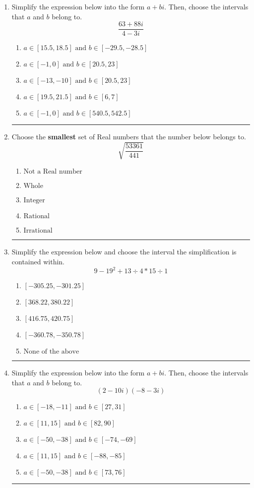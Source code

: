 \documentclass[14pt]{extbook}
\newcommand{\litem}[1]{\item#1\hspace*{-1cm}\rule{\textwidth}{0.4pt}}
\begin{document}
\begin{enumerate}
{\begin{enumerate}[label=\Alph*.]
\end{enumerate} }
\litem{
Simplify the expression below into the form $a+bi$. Then, choose the intervals that $a$ and $b$ belong to.\[ \frac{63 + 88 i}{4 - 3 i} \]\begin{enumerate}[label=\Alph*.]
\item \( a \in [15.5, 18.5] \text{ and } b \in [-29.5, -28.5] \)
\item \( a \in [-1, 0] \text{ and } b \in [20.5, 23] \)
\item \( a \in [-13, -10] \text{ and } b \in [20.5, 23] \)
\item \( a \in [19.5, 21.5] \text{ and } b \in [6, 7] \)
\item \( a \in [-1, 0] \text{ and } b \in [540.5, 542.5] \)

\end{enumerate} }
\litem{
Choose the \textbf{smallest} set of Real numbers that the number below belongs to.\[ \sqrt{\frac{53361}{441}} \]\begin{enumerate}[label=\Alph*.]
\item \( \text{Not a Real number} \)
\item \( \text{Whole} \)
\item \( \text{Integer} \)
\item \( \text{Rational} \)
\item \( \text{Irrational} \)

\end{enumerate} }
\litem{
Simplify the expression below and choose the interval the simplification is contained within.\[ 9 - 19^2 + 13 \div 4 * 15 \div 1 \]\begin{enumerate}[label=\Alph*.]
\item \( [-305.25, -301.25] \)
\item \( [368.22, 380.22] \)
\item \( [416.75, 420.75] \)
\item \( [-360.78, -350.78] \)
\item \( \text{None of the above} \)

\end{enumerate} }
\litem{
Simplify the expression below into the form $a+bi$. Then, choose the intervals that $a$ and $b$ belong to.\[ (2 - 10 i)(-8 - 3 i) \]\begin{enumerate}[label=\Alph*.]
\item \( a \in [-18, -11] \text{ and } b \in [27, 31] \)
\item \( a \in [11, 15] \text{ and } b \in [82, 90] \)
\item \( a \in [-50, -38] \text{ and } b \in [-74, -69] \)
\item \( a \in [11, 15] \text{ and } b \in [-88, -85] \)
\item \( a \in [-50, -38] \text{ and } b \in [73, 76] \)


\end{enumerate}}
\end{enumerate}
\end{document}
